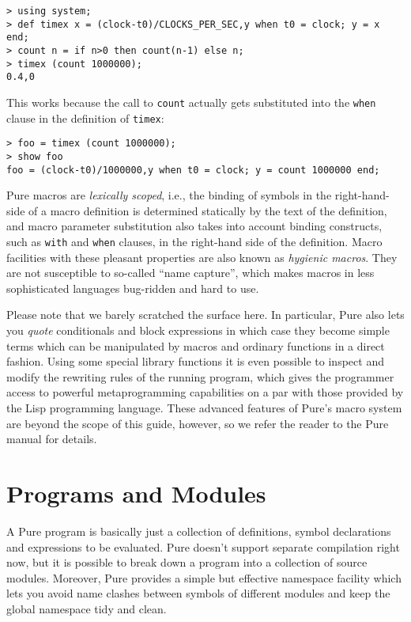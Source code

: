 \documentclass[a4paper,12pt]{article}
\begin{document}
\begin{lstlisting}
> using system;
> def timex x = (clock-t0)/CLOCKS_PER_SEC,y when t0 = clock; y = x end;
> count n = if n>0 then count(n-1) else n;
> timex (count 1000000);
0.4,0
\end{lstlisting}

This works because the call to \verb|count| actually gets substituted into the \lstinline{when} clause in the definition of \verb|timex|:

\begin{lstlisting}
> foo = timex (count 1000000);
> show foo
foo = (clock-t0)/1000000,y when t0 = clock; y = count 1000000 end;
\end{lstlisting}

Pure macros are \emph{lexically scoped}, i.e., the binding of symbols in the right-hand-side of a macro definition is determined statically by the text of the definition, and macro parameter substitution also takes into account binding constructs, such as \lstinline{with} and \lstinline{when} clauses, in the right-hand side of the definition. Macro facilities with these pleasant properties are also known as \emph{hygienic macros}. They are not susceptible to so-called ``name capture'', which makes macros in less sophisticated languages bug-ridden and hard to use.

Please note that we barely scratched the surface here. In particular, Pure also lets you \emph{quote} conditionals and block expressions in which case they become simple terms which can be manipulated by macros and ordinary functions in a direct fashion. Using some special library functions it is even possible to inspect and modify the rewriting rules of the running program, which gives the programmer access to powerful metaprogramming capabilities on a par with those provided by the Lisp programming language. These advanced features of Pure's macro system are beyond the scope of this guide, however, so we refer the reader to the Pure manual for details.

\section{Programs and Modules}
\label{Programs}

A Pure program is basically just a collection of definitions, symbol declarations and expressions to be evaluated. Pure doesn't support separate compilation right now, but it is possible to break down a program into a collection of source modules. Moreover, Pure provides a simple but effective namespace facility which lets you avoid name clashes between symbols of different modules and keep the global namespace tidy and clean.
\end{document}
